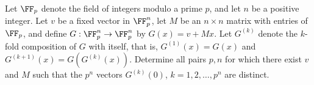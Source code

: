 Let $\FF_p$ denote the field of integers modulo a prime $p$, and let $n$ be a positive integer.
Let $v$ be a fixed vector in $\FF_p^n$, let $M$ be an $n \times n$ matrix with entries of $\FF_p$,
and define $G: \FF_p^n \to \FF_p^n$ by $G(x) = v + Mx$. Let $G^{(k)}$ denote the $k$-fold
composition of $G$ with itself, that is, $G^{(1)}(x) = G(x)$ and $G^{(k+1)}(x) = G(G^{(k)}(x))$.
Determine all pairs $p, n$ for which there exist $v$ and $M$ such that the $p^n$ vectors
$G^{(k)}(0)$, $k=1,2,\dots,p^n$ are distinct.
